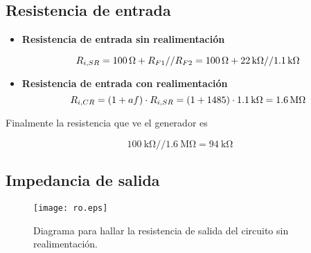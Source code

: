 \subsection{Resistencia de entrada}

\begin{itemize}
	
		
\item \textbf{Resistencia de entrada sin realimentación}
	
	\begin{equation}
		\centering
		R_{i,SR} = \SI{100}{\ohm} + R_{F1}//R_{F2} = \SI{100}{\ohm} + \SI{22}{\kilo\ohm}//\SI{1.1}{\kilo\ohm}
	\end{equation}
	
\item \textbf{Resistencia de entrada con realimentación}
	\begin{equation}
		\centering
		R_{i,CR} = (1+ af) \cdot R_{i,SR} = (1 + 1485) \cdot \SI{1.1}{\kilo\ohm} = \SI{1.6}{\mega\ohm}
	\end{equation}
	
\end{itemize}

Finalmente la resistencia que ve el generador es

$$ \SI{100}{\kilo\ohm}//\SI{1.6}{\mega\ohm} = \boxed{\SI{94}{\kilo\ohm}} $$


\subsection{Impedancia de salida}

\begin{figure}[H]
	 \centering
	 \texttt{[image: ro.eps]}
	 \caption{Diagrama para hallar la resistencia de salida del circuito sin realimentación.}
\end{figure}

